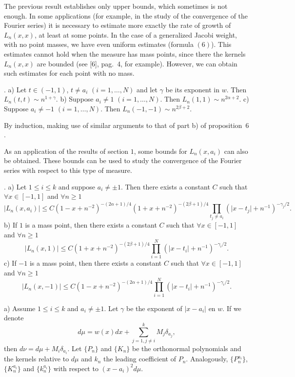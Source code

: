 \medskip

The previous result establishes only upper bounds, which sometimes is not
enough. In some applications (for example, in the study of the convergence
of the Fourier series) it is necessary to estimate more exactly the rate of
growth of $L_n(x,x)$, at least at some points. In the case of a generalized
Jacobi weight, with no point masses, we have even uniform estimates (formula
$(6)$). This estimates cannot hold when the measure has mass points, since there
the kernels $L_n(x,x)$ are bounded (see [6], pag.~4, for example). However, we
can obtain such estimates for each point with no mass.

. a) Let $t \in (-1,1)$, $t \not= a_i$
$(i=1,\dots,N)$ and let $\gamma$ be its exponent in $w$. Then $L_n(t,t) \sim
n^{1+\gamma}$. \hfil \break
b) Suppose $a_i \not= 1$ $(i=1,\dots,N)$. Then $L_n(1,1) \sim n^{2\alpha
+2}$. \hfil \break
c) Suppose $a_i \not= -1$ $(i=1,\dots,N)$. Then $L_n(-1,-1) \sim n^{2\beta +2}$.

\proof By induction, making use of similar arguments to that of part b) of
proposition~$6$.

\medskip

As an application of the results of section $1$, some bounds for $L_n(x,a_i)$ can
also be obtained. These bounds can be used to study the convergence of the
Fourier series with respect to this type of measure.

. a) Let $1 \leq i \leq k$ and suppose $a_i \not= \pm
1$. Then there exists a constant $C$ such that $\forall x \in [-1,1]$ and
$\forall n \geq 1$
$$
   \vert L_n(x,a_i) \vert \leq C (1-x+n^{-2})^{-(2\alpha+1)/4}
   (1+x+n^{-2})^{-(2\beta+1)/4} 
   \prod_{t_j \not= a_i} (\vert x-t_j \vert+n^{-1})^{-\gamma_j/2}.
$$
b) If $1$ is a mass point, then there exists a constant $C$ such that $\forall x
\in [-1,1]$ and $\forall n \geq 1$
$$
   \vert L_n(x,1) \vert \leq C (1+x+n^{-2})^{-(2\beta+1)/4} 
   \prod_{i=1}^N (\vert x-t_i \vert+n^{-1})^{-\gamma_i/2}.
$$
c) If $-1$ is a mass point, then there exists a constant $C$ such that $\forall x
\in [-1,1]$ and $\forall n \geq 1$
$$
   \vert L_n(x,-1) \vert \leq C (1-x+n^{-2})^{-(2\alpha+1)/4}
   \prod_{i=1}^N (\vert x-t_i \vert+n^{-1})^{-\gamma_i/2}.
$$

\proof a) Assume $1 \leq i \leq k$ and $a_i \not= \pm 1$. Let $\gamma$ be the
exponent of $\vert x-a_i \vert$ en $w$. If we denote
$$
   d\mu = w(x)dx + \sum_{j=1,j\not= i}^k M_j\delta_{a_j},
$$
then $d\nu = d\mu + M_i\delta_{a_i}$. Let $\{P_n\}$ and $\{K_n\}$ be the
orthonormal polynomials and the kernels relative to $d\mu$ and $k_n$ the
leading coefficient of $P_n$. Analogously, $\{P_n^{a_i}\}$, $\{K_n^{a_i}\}$ and
$\{k_n^{a_i}\}$ with respect to $(x-a_i)^2d\mu$.

